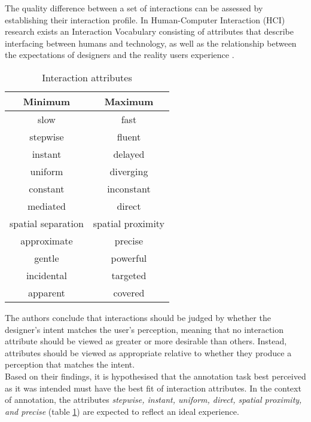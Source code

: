 \documentclass[../report.tex]{subfiles}
\begin{document}
The quality difference between a set of interactions can be assessed by establishing their interaction profile. In Human-Computer Interaction (HCI) research exists an Interaction Vocabulary consisting of attributes that describe interfacing between humans and technology, as well as the relationship between the expectations of designers and the reality users experience \cite{Lenz2013Attributes}. \\

\begin{table}[h]
\centering
\begin{tabular}{c c}
\hline
\textbf{Minimum} & \textbf{Maximum} \\ [0.5ex]
\hline
slow & fast \\
stepwise & fluent \\
instant & delayed \\
uniform & diverging \\
constant & inconstant \\
mediated & direct \\
spatial separation & spatial proximity \\
approximate & precise \\
gentle & powerful \\
incidental & targeted \\
apparent & covered \\ [1ex] 
\hline
\end{tabular}
\caption{Interaction attributes}
\label{table:attributes}
\end{table}

The authors conclude that interactions should be judged by whether the designer's intent matches the user's perception, meaning that no interaction attribute should be viewed as greater or more desirable than others. Instead, attributes should be viewed as appropriate relative to whether they produce a perception that matches the intent. \\

Based on their findings, it is hypothesised that the annotation task best perceived as it was intended must have the best fit of interaction attributes. In the context of annotation, the attributes \textit{stepwise, instant, uniform, direct, spatial proximity, and precise} (table \ref{table:attributes}) are expected to reflect an ideal experience.
\end{document}
